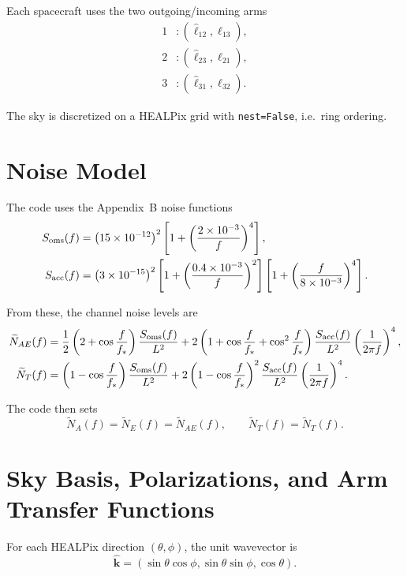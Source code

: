 \documentclass[11pt]{article}
\begin{document}
Each spacecraft uses the two outgoing/incoming arms
\begin{align}
1 &: (\hat{\ell}_{12},\hat{\ell}_{13}), \\
2 &: (\hat{\ell}_{23},\hat{\ell}_{21}), \\
3 &: (\hat{\ell}_{31},\hat{\ell}_{32}).
\end{align}

The sky is discretized on a HEALPix grid with \texttt{nest=False}, i.e.\ ring ordering.

\section{Noise Model}
The code uses the Appendix~B noise functions
\begin{align}
S_{\rm oms}(f) &=
\left(15\times 10^{-12}\right)^2
\left[1+\left(\frac{2\times 10^{-3}}{f}\right)^4\right], \\
S_{\rm acc}(f) &=
\left(3\times 10^{-15}\right)^2
\left[1+\left(\frac{0.4\times 10^{-3}}{f}\right)^2\right]
\left[1+\left(\frac{f}{8\times 10^{-3}}\right)^4\right].
\end{align}

From these, the channel noise levels are
\begin{align}
\widetilde N_{AE}(f) &=
\frac{1}{2}\left(2+\cos\frac{f}{f_*}\right)\frac{S_{\rm oms}(f)}{L^2}
{}+
2\left(1+\cos\frac{f}{f_*}+\cos^2\frac{f}{f_*}\right)
\frac{S_{\rm acc}(f)}{L^2}\left(\frac{1}{2\pi f}\right)^4, \\
\widetilde N_T(f) &=
\left(1-\cos\frac{f}{f_*}\right)\frac{S_{\rm oms}(f)}{L^2}
{}+
2\left(1-\cos\frac{f}{f_*}\right)^2
\frac{S_{\rm acc}(f)}{L^2}\left(\frac{1}{2\pi f}\right)^4.
\end{align}

The code then sets
\begin{equation}
\widetilde N_A(f)=\widetilde N_E(f)=\widetilde N_{AE}(f),
\qquad
\widetilde N_T(f)=\widetilde N_T(f).
\end{equation}

\section{Sky Basis, Polarizations, and Arm Transfer Functions}
For each HEALPix direction $(\theta,\phi)$, the unit wavevector is
\begin{equation}
\hat{\mathbf{k}} =
(\sin\theta\cos\phi,\sin\theta\sin\phi,\cos\theta).
\end{equation}
\end{document}
